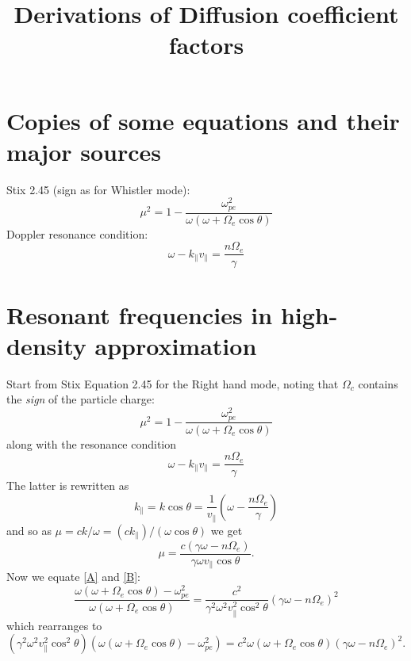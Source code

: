 \documentclass[]{article}
\title{Derivations of Diffusion coefficient factors}
\begin{document}
\tableofcontents

\section{Copies of some equations and their major sources}
Stix 2.45 (sign as for Whistler mode):
\begin{equation}
\mu^2 =  1 - \frac {\omega_{pe}^2}{\omega(\omega + \Omega_e \cos\theta)}
\end{equation}
Doppler resonance condition:
\begin{equation}
\omega -k_\parallel v_\parallel = \frac{n \Omega_e}{\gamma}
\end{equation}



\section{Resonant frequencies in high-density approximation}
Start from Stix Equation 2.45 for the Right hand mode, noting that $\Omega_c$ contains the \emph{sign} of the particle charge:
\begin{equation}\label{A}
\mu^2 =  1 - \frac {\omega_{pe}^2}{\omega(\omega + \Omega_e \cos\theta)}
\end{equation}
along with the resonance condition
\begin{equation}
\omega -k_\parallel v_\parallel = \frac{n \Omega_e}{\gamma}
\end{equation}
The latter is rewritten as
\begin{equation}
k_\parallel = k \cos\theta = \frac{1}{v_\parallel} \left(\omega - \frac{n \Omega_e}{\gamma} \right) \end{equation}
and so as $ \mu = c k /\omega = (c k_\parallel)/( \omega \cos\theta)$ we get
\begin{equation}\label{B}
\mu = \frac{c ( \gamma \omega - n \Omega_e)}{\gamma\omega v_\parallel \cos\theta}.
\end{equation}
Now we equate \ref{A} and \ref{B}:
\begin{equation}
\frac{\omega(\omega + \Omega_e \cos\theta) - \omega_{pe}^2}{\omega(\omega + \Omega_e \cos\theta)} = \frac{c^2}{\gamma^2 \omega^2 v_\parallel^2 \cos^2\theta} (\gamma \omega - n \Omega_e)^2 \end{equation}
which rearranges to
\begin{equation}
(\gamma^2 \omega^2 v_\parallel^2 \cos^2\theta) (\omega(\omega + \Omega_e \cos\theta) - \omega_{pe}^2) = c^2 \omega(\omega + \Omega_e \cos\theta)(\gamma \omega - n \Omega_e)^2. \end{equation}
\end{document}
